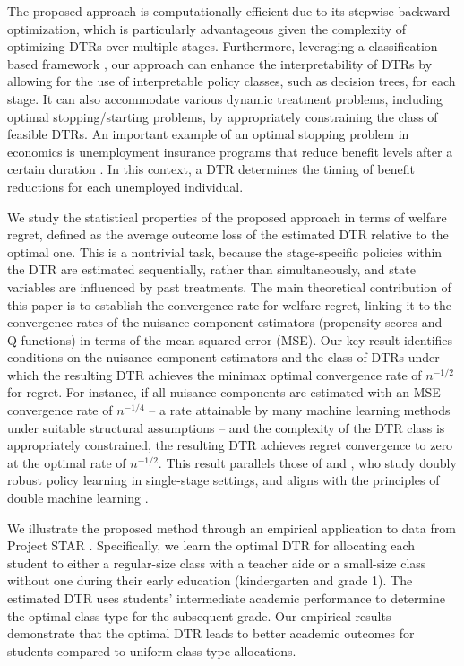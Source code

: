 The proposed approach is computationally efficient due to its stepwise backward optimization, which is particularly advantageous given the complexity of optimizing DTRs over multiple stages. Furthermore, leveraging a classification-based framework \citep{Zhao_et_al_2012, Kitagawa_Tetenov_2018a}, our approach can enhance the interpretability of DTRs by allowing for the use of interpretable policy classes, such as decision trees, for each stage. It can also accommodate various dynamic treatment problems, including optimal stopping/starting problems, by appropriately constraining the class of feasible DTRs.
An important example of an optimal stopping problem in economics is unemployment insurance programs that reduce benefit levels after a certain duration \citep[e.g.,][]{Meyer_1995,Kolsrud_et_al_2018}. In this context, a DTR determines the timing of benefit reductions for each unemployed individual.


We study the statistical properties of the proposed approach in terms of welfare regret, defined as the average outcome loss of the estimated DTR relative to the optimal one. This is a nontrivial task, because the stage-specific policies within the DTR are estimated sequentially, rather than simultaneously, and state variables are influenced by past treatments. The main theoretical contribution of this paper is to establish the convergence rate for welfare regret, linking it to the convergence rates of the nuisance component estimators (propensity scores and Q-functions) in terms of the mean-squared error (MSE). Our key result identifies conditions on the nuisance component estimators and the class of DTRs under which the resulting DTR achieves the minimax optimal convergence rate of $n^{-1/2}$ for regret.
For instance, if all nuisance components are estimated with an MSE convergence rate of $n^{-1/4}$ -- a rate attainable by many machine learning methods under suitable structural assumptions -- and the complexity of the DTR class is appropriately constrained, the resulting DTR achieves regret convergence to zero at the optimal rate of $n^{-1/2}$. This result parallels those of \cite{Athey_Wager_2020} and \cite{zhou2022offline}, who study doubly robust policy learning in single-stage settings, and aligns with the principles of double machine learning \citep{chernozhukov_et_al_2018}.

We illustrate the proposed method through an empirical application to data from Project STAR \citep[e.g.,][]{krueger_1999}. Specifically, we learn the optimal DTR for allocating each student to either a regular-size class with a teacher aide or a small-size class without one during their early education (kindergarten and grade 1). The estimated DTR uses students’ intermediate academic performance to determine the optimal class type for the subsequent grade. Our empirical results demonstrate that the optimal DTR leads to better academic outcomes for students compared to uniform class-type allocations.

